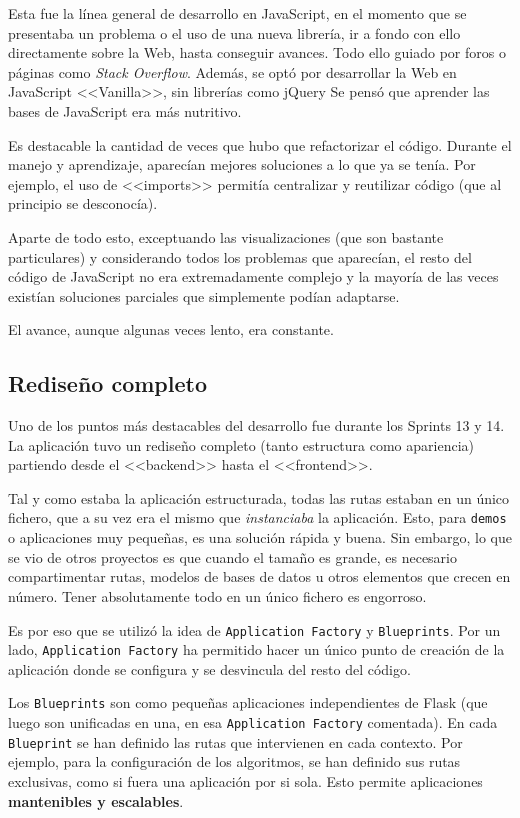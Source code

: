 Esta fue la línea general de desarrollo en JavaScript, en el momento que se
presentaba un problema o el uso de una nueva librería, ir a fondo con ello
directamente sobre la Web, hasta conseguir avances. Todo ello guiado por foros o
páginas como \textit{Stack Overflow}. Además, se optó por desarrollar la Web en
JavaScript <<Vanilla>>, sin librerías como jQuery Se pensó que aprender las
bases de JavaScript era más nutritivo.

Es destacable la cantidad de veces que hubo que refactorizar el código. Durante
el manejo y aprendizaje, aparecían mejores soluciones a lo que ya se tenía. Por
ejemplo, el uso de <<imports>> permitía centralizar y reutilizar código (que al
principio se desconocía).

Aparte de todo esto, exceptuando las visualizaciones (que son bastante
particulares) y considerando todos los problemas que aparecían, el resto del
código de JavaScript no era extremadamente complejo y la mayoría de las veces
existían soluciones parciales que simplemente podían adaptarse. 

El avance, aunque algunas veces lento, era constante.

\subsection{Rediseño completo}

Uno de los puntos más destacables del desarrollo fue durante los Sprints 13 y
14. La aplicación tuvo un rediseño completo (tanto estructura como apariencia)
partiendo desde el <<backend>> hasta el <<frontend>>.

Tal y como estaba la aplicación estructurada, todas las rutas estaban en un
único fichero, que a su vez era el mismo que \textit{instanciaba} la aplicación.
Esto, para \texttt{demos} o aplicaciones muy pequeñas, es una solución rápida y
buena. Sin embargo, lo que se vio de otros proyectos es que cuando el tamaño es
grande, es necesario compartimentar rutas, modelos de bases de datos u otros
elementos que crecen en número. Tener absolutamente todo en un único fichero es
engorroso.

Es por eso que se utilizó la idea de \texttt{Application Factory} y
\texttt{Blueprints}. Por un lado, \texttt{Application Factory} ha permitido
hacer un único punto de creación de la aplicación donde se configura y se
desvincula del resto del código.

Los \texttt{Blueprints} son como pequeñas aplicaciones independientes de Flask
(que luego son unificadas en una, en esa \texttt{Application Factory}
comentada). En cada \texttt{Blueprint} se han definido las rutas que intervienen
en cada contexto. Por ejemplo, para la configuración de los algoritmos, se han
definido sus rutas exclusivas, como si fuera una aplicación por si sola. Esto
permite aplicaciones \textbf{mantenibles y escalables}.


